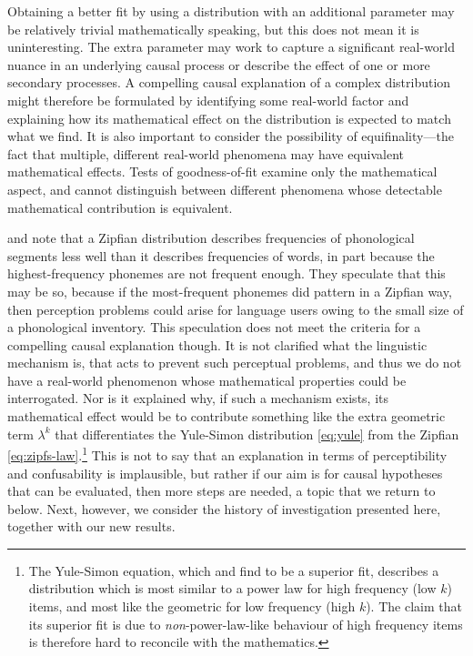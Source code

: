 Obtaining a better fit by using a distribution with an additional parameter may be relatively trivial mathematically speaking, but this does not mean it is uninteresting. The extra parameter may work to capture a significant real-world nuance in an underlying causal process or describe the effect of one or more secondary processes. A compelling causal explanation of a complex distribution might therefore be formulated by identifying some real-world factor and explaining how its mathematical effect on the distribution is expected to match what we find. It is also important to consider the possibility of equifinality---the fact that multiple, different real-world phenomena may have equivalent mathematical effects. Tests of goodness-of-fit examine only the mathematical aspect, and cannot distinguish between different phenomena whose detectable mathematical contribution is equivalent.

\textcite[p.~111]{martindale_comparison_1996} and \textcite[p.~9]{tambovtsev_phoneme_2007} note that a Zipfian distribution describes frequencies of phonological segments less well than it describes frequencies of words, in part because the highest-frequency phonemes are not frequent enough. They speculate that this may be so, because if the most-frequent phonemes did pattern in a Zipfian way, then perception problems could arise for language users owing to the small size of a phonological inventory. This speculation does not meet the criteria for a compelling causal explanation though. It is not clarified what the linguistic mechanism is, that acts to prevent such perceptual problems, and thus we do not have a real-world phenomenon whose mathematical properties could be interrogated. Nor is it explained why, if such a mechanism exists, its mathematical effect would be to contribute something like the extra geometric term \(\lambda^k\) that differentiates the Yule-Simon distribution \eqref{eq:yule} from the Zipfian \eqref{eq:zipfs-law}.\footnote{The Yule-Simon equation, which \textcite{martindale_comparison_1996} and \textcite{tambovtsev_phoneme_2007} find to be a superior fit, describes a distribution which is most similar to a power law for high frequency (low \(k\)) items, and most like the geometric for low frequency (high \(k\)). The claim that its superior fit is due to \emph{non}-power-law-like behaviour of high frequency items is therefore hard to reconcile with the mathematics.} This is not to say that an explanation in terms of perceptibility and confusability is implausible, but rather if our aim is for causal hypotheses that can be evaluated, then more steps are needed, a topic that we return to below. Next, however, we consider the history of investigation presented here, together with our new results.

